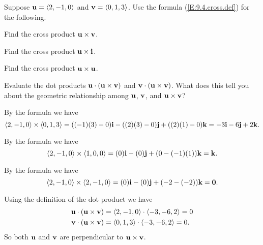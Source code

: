 \begin{activity} \label{A:9.4.5}  Suppose 
  $\mathbf{u} = \langle 2, -1, 0\rangle$ and $\mathbf{v} = \langle 0, 1, 3\rangle$.
  Use the formula (\ref{E:9.4.cross.def}) for the following.
  \ba
  \item Find the cross product $\mathbf{u}\times\mathbf{v}$.  

  \item Find the cross product $\mathbf{u}\times \mathbf{i}$.

  \item Find the cross product $\mathbf{u}\times\mathbf{u}$.

  \item Evaluate the dot products $\mathbf{u}\cdot(\mathbf{u}\times\mathbf{v})$ and
    $\mathbf{v}\cdot(\mathbf{u}\times\mathbf{v})$.  What does this tell you about the
    geometric relationship among $\mathbf{u}$, $\mathbf{v}$, and $\mathbf{u}\times\mathbf{v}$?

    \ea
\end{activity}

\begin{activitySolution}
\ba
	\item By the formula we have
\[\langle 2, -1, 0\rangle \times \langle 0, 1, 3\rangle = ((-1)(3)-0) \mathbf{i} - ((2)(3)-0)\mathbf{j} + ((2)(1)-0)\mathbf{k} = -3 \mathbf{i} - 6\mathbf{j} + 2\mathbf{k}.\]

	\item By the formula we have
\[\langle 2, -1, 0\rangle \times \langle 1, 0, 0\rangle = (0) \mathbf{i} - (0)\mathbf{j} + (0-(-1)(1))\mathbf{k} = \mathbf{k}.\] 

	\item By the formula we have
\[\langle 2, -1, 0\rangle \times \langle 2, -1, 0\rangle = (0) \mathbf{i} - (0)\mathbf{j} + (-2-(-2))\mathbf{k} = \mathbf{0}.\] 

	\item Using the definition of the dot product we have
	\begin{align*}
	\mathbf{u}\cdot(\mathbf{u}\times\mathbf{v}) &= \langle 2, -1, 0\rangle \cdot \langle -3, -6, 2 \rangle = 0 \\
	\mathbf{v}\cdot(\mathbf{u}\times\mathbf{v}) &= \langle 0, 1, 3\rangle \cdot \langle -3, -6, 2 \rangle = 0.
	\end{align*}
So both $\mathbf{u}$ and $\mathbf{v}$ are perpendicular to $\mathbf{u}\times\mathbf{v}$. 
	\ea
\end{activitySolution}

\aftera
